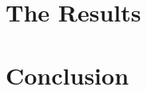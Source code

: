 \documentclass{esda}
\begin{document}
\cleardoublepage
\section{The Results}
\label{sec:res}


\cleardoublepage
\section{Conclusion}
\label{sec:conc}


\cleardoublepage
{}

\end{document}
